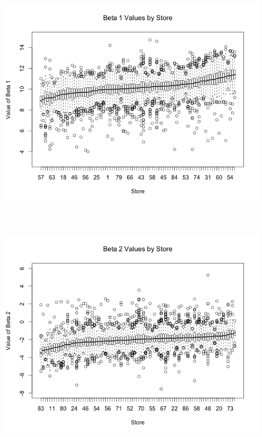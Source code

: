 \documentclass[12pt,letterpaper]{article}\usepackage[]{graphicx}\usepackage[]{color}
\begin{document}
\includegraphics[height=12cm, keepaspectratio]{new-beta1.png}\\
\includegraphics[height=12cm, keepaspectratio]{new-beta2.png}\\
\end{document}
